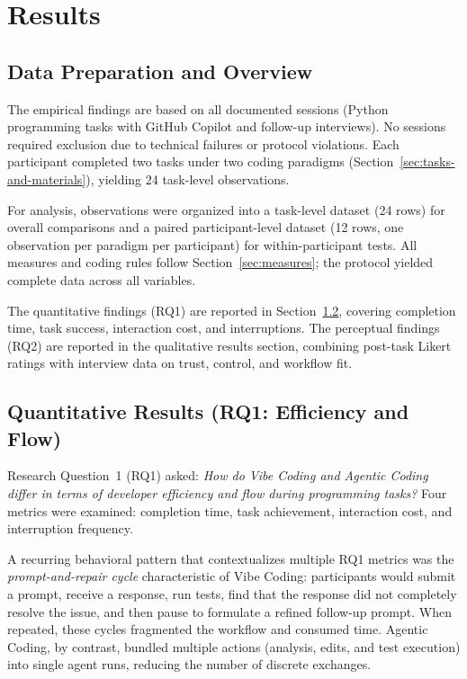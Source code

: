 \chapter{Results}
\label{chap:results}

\section{Data Preparation and Overview}

The empirical findings are based on all documented  sessions (Python programming tasks with GitHub Copilot and follow-up interviews). No sessions required exclusion due to technical failures or protocol violations. Each participant completed two tasks under two coding paradigms (Section~\ref{sec:tasks-and-materials}), yielding 24 task-level observations.

For analysis, observations were organized into a task-level dataset (24 rows) for overall comparisons and a paired participant-level dataset (12 rows, one observation per paradigm per participant) for within-participant tests. All measures and coding rules follow Section~\ref{sec:measures}; the protocol yielded complete data across all variables.

The quantitative findings (RQ1) are reported in Section~\ref{sec:rq1}, covering completion time, task success, interaction cost, and interruptions. The perceptual findings (RQ2) are reported in the qualitative results section, combining post-task Likert ratings with interview data on trust, control, and workflow fit.

\section{Quantitative Results (RQ1: Efficiency and Flow)}
\label{sec:rq1}

Research Question~1 (RQ1) asked: \emph{How do Vibe Coding and Agentic Coding differ in terms of developer efficiency and flow during programming tasks?} Four metrics were examined: completion time, task achievement, interaction cost, and interruption frequency.

A recurring behavioral pattern that contextualizes multiple RQ1 metrics was the \emph{prompt-and-repair cycle} characteristic of Vibe Coding: participants would submit a prompt, receive a response, run tests, find that the response did not completely resolve the issue, and then pause to formulate a refined follow-up prompt. When repeated, these cycles fragmented the workflow and consumed time. Agentic Coding, by contrast, bundled multiple actions (analysis, edits, and test execution) into single agent runs, reducing the number of discrete exchanges.

